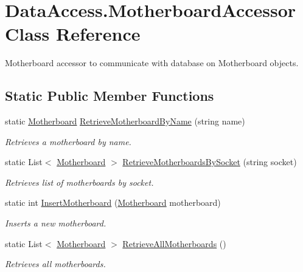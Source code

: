 \hypertarget{class_data_access_1_1_motherboard_accessor}{}\section{Data\+Access.\+Motherboard\+Accessor Class Reference}
\label{class_data_access_1_1_motherboard_accessor}


Motherboard accessor to communicate with database on Motherboard objects.  


\subsection*{Static Public Member Functions}
\begin{DoxyCompactItemize}
\item 
static \hyperlink{class_business_objects_1_1_motherboard}{Motherboard} \hyperlink{class_data_access_1_1_motherboard_accessor_ad37526e07fc9b4e31ebe7c00948a0ce6}{Retrieve\+Motherboard\+By\+Name} (string name)
\begin{DoxyCompactList}\small\item\em Retrieves a motherboard by name. \end{DoxyCompactList}\item 
static List$<$ \hyperlink{class_business_objects_1_1_motherboard}{Motherboard} $>$ \hyperlink{class_data_access_1_1_motherboard_accessor_af11568bcfecf3d6d5223838a5e449f7a}{Retrieve\+Motherboards\+By\+Socket} (string socket)
\begin{DoxyCompactList}\small\item\em Retrieves list of motherboards by socket. \end{DoxyCompactList}\item 
static int \hyperlink{class_data_access_1_1_motherboard_accessor_a6209b0ce1d698b60cb47acb27d7ab18f}{Insert\+Motherboard} (\hyperlink{class_business_objects_1_1_motherboard}{Motherboard} motherboard)
\begin{DoxyCompactList}\small\item\em Inserts a new motherboard. \end{DoxyCompactList}\item 
static List$<$ \hyperlink{class_business_objects_1_1_motherboard}{Motherboard} $>$ \hyperlink{class_data_access_1_1_motherboard_accessor_a52361abf7892868739ce5a3a7107e00f}{Retrieve\+All\+Motherboards} ()
\begin{DoxyCompactList}\small\item\em Retrieves all motherboards. \end{DoxyCompactList}\end{DoxyCompactItemize}


